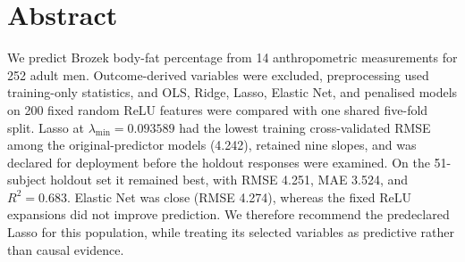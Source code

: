 \section*{Abstract}

We predict Brozek body-fat percentage from 14 anthropometric measurements for
252 adult men.  Outcome-derived variables were excluded, preprocessing used
training-only statistics, and OLS, Ridge, Lasso, Elastic Net, and penalised
models on 200 fixed random ReLU features were compared with one shared
five-fold split.  Lasso at $\lambda_{\min}=0.093589$ had the lowest training
cross-validated RMSE among the original-predictor models (4.242), retained nine
slopes, and was declared for deployment before the holdout responses were
examined.  On the 51-subject holdout set it remained best, with RMSE 4.251,
MAE 3.524, and $R^2=0.683$.  Elastic Net was close (RMSE 4.274), whereas the
fixed ReLU expansions did not improve prediction.  We therefore recommend the
predeclared Lasso for this population, while treating its selected variables as
predictive rather than causal evidence.

\bigskip
